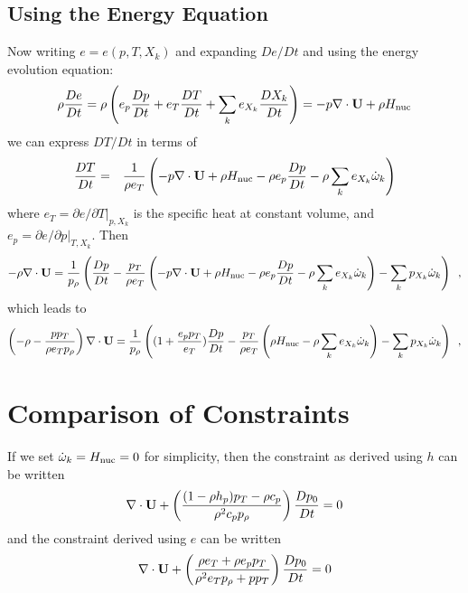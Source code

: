 \subsection{Using the Energy Equation}

Now writing $e = e(p,T,X_k)$ and expanding $De/Dt$ and using the energy evolution equation:
\begin{equation}
\rho \frac{D e}{Dt}  = \rho \left( e_p \frac{D p}{Dt} + e_T \frac{D T}{Dt} + \sum_k e_{X_k} \frac{D X_k}{Dt} \right)
                     = -p \nabla \cdot {\bf U} + \rho {H_{\rm nuc}}
\end{equation}
we can express $DT/Dt$ in terms of 
\begin{eqnarray*}
\frac{DT}{Dt} &=& \frac{1}{\rho e_T} \left(
                  -p \nabla \cdot {\bf U} + \rho {H_{\rm nuc}}
                 - \rho e_p \frac{D p}{Dt}
                 - \rho \sum_k e_{X_k} \dot{\omega}_k   \right)
\end{eqnarray*}
where $e_T = \left.\partial e/\partial T\right|_{p,X_k}$ is the
specific heat at constant volume,
and $e_p = \left.\partial e/\partial p\right|_{T,X_k}.$
Then
\begin{equation}
-\rho \nabla \cdot {\bf U} = 
    \frac{1}{p_\rho} \left( \frac{D p}{Dt} 
    - \frac{p_T}{\rho e_T} \left(
                 -p \nabla \cdot {\bf U} + \rho {H_{\rm nuc}}
                 - \rho e_p \frac{D p}{Dt}
                 - \rho \sum_k e_{X_k} \dot{\omega}_k   \right)
    - \sum_k p_{X_k} {\dot{\omega}}_k \right) \enskip ,
\end{equation}
which leads to 
\begin{equation}
\left(-\rho -  \frac{p p_T}{\rho e_T p_\rho} \right) \nabla \cdot {\bf U} = 
    \frac{1}{p_\rho} \left( (1 + \frac{e_p p_T}{e_T}) \frac{D p}{Dt} 
                           - \frac{p_T}{\rho e_T} \left(
                                        \rho {H_{\rm nuc}}
                                        - \rho \sum_k e_{X_k} \dot{\omega}_k   \right)
    - \sum_k p_{X_k} {\dot{\omega}}_k \right) \enskip ,
\end{equation}

\section{Comparison of Constraints}

If we set $\dot{\omega}_k = {H_{\rm nuc}} = 0$ for simplicity, then the constraint as derived using $h$ can be written 
\begin{equation}
\nabla \cdot {\bf U}
+ \left( \frac{(1 - \rho h_p )p_T - \rho c_p}{\rho^2
  c_p p_\rho} \right) \frac{D p_0}{D t} = 0
\end{equation}
and the constraint derived using $e$ can be written
\begin{equation}
\nabla \cdot {\bf U} 
+ \left( \frac{\rho e_T + \rho e_p p_T}{\rho^2 e_T p_\rho + p p_T} \right) \frac{D p_0}{D t} = 0
\end{equation}

